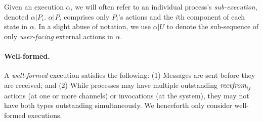 Given an execution $\alpha$, we will often refer to an individual process's
\textit{sub-execution}, denoted $\alpha|P_i$. $\alpha|P_i$ comprises
only $P_i$'s actions and the $i$th component of each state in $\alpha$.
In a slight abuse of notation, we use $\alpha|U$ to denote the sub-sequence
of only \textit{user-facing} external actions in $\alpha$. 

\paragraph{Well-formed.} A \textit{well-formed} execution
satisfies the following: (1) Messages are sent before they are received; and
(2) While processes may have multiple outstanding $\operatorname*{\textit{recvfrom}}_{ij}$ actions
(at one or more channels) or invocations (at the system), they may not have
both types outstanding simultaneously.
We henceforth only consider well-formed
executions.

